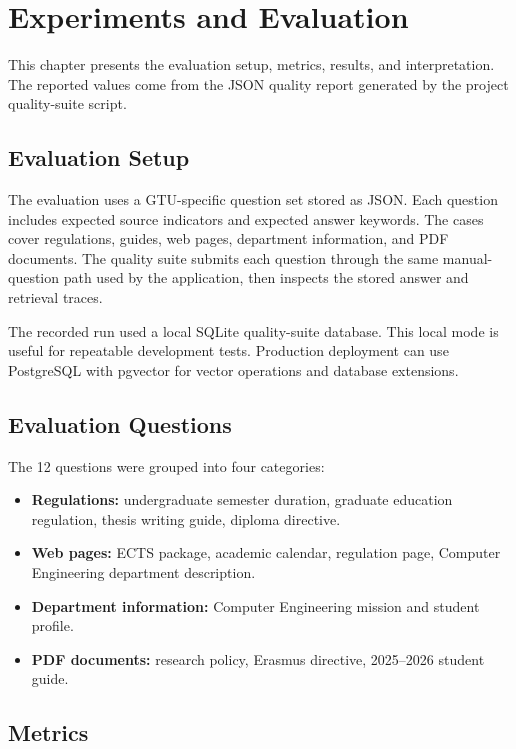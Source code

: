\chapter{Experiments and Evaluation}

This chapter presents the evaluation setup, metrics, results, and interpretation. The reported values come from the JSON quality report generated by the project quality-suite script.

\section{Evaluation Setup}

The evaluation uses a GTU-specific question set stored as JSON. Each question includes expected source indicators and expected answer keywords. The cases cover regulations, guides, web pages, department information, and PDF documents. The quality suite submits each question through the same manual-question path used by the application, then inspects the stored answer and retrieval traces.

The recorded run used a local SQLite quality-suite database. This local mode is useful for repeatable development tests. Production deployment can use PostgreSQL with pgvector for vector operations and database extensions.

\section{Evaluation Questions}

The 12 questions were grouped into four categories:

\begin{itemize}
    \item \textbf{Regulations:} undergraduate semester duration, graduate education regulation, thesis writing guide, diploma directive.
    \item \textbf{Web pages:} ECTS package, academic calendar, regulation page, Computer Engineering department description.
    \item \textbf{Department information:} Computer Engineering mission and student profile.
    \item \textbf{PDF documents:} research policy, Erasmus directive, 2025--2026 student guide.
\end{itemize}

\section{Metrics}

